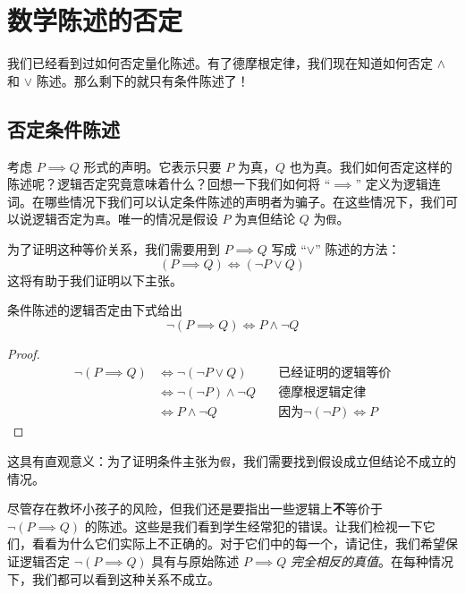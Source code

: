 \section{数学陈述的否定}\label{sec:section4.7}

我们已经看到过如何否定量化陈述。有了德摩根定律，我们现在知道如何否定 $\land$ 和 $\lor$ 陈述。那么剩下的就只有条件陈述了！

\subsection{否定条件陈述}

考虑 $P \implies Q$ 形式的声明。它表示只要 $P$ 为真，$Q$ 也为真。我们如何否定这样的陈述呢？逻辑否定究竟意味着什么？回想一下我们如何将 ``$\implies$'' 定义为逻辑连词。在哪些情况下我们可以认定条件陈述的声明者为骗子。在这些情况下，我们可以说逻辑否定为\verb|真|。唯一的情况是假设 $P$ 为\verb|真|但结论 $Q$ 为\verb|假|。

为了证明这种等价关系，我们需要用到 $P \implies Q$ 写成 ``$\lor$'' 陈述的方法：
\[(P \implies Q) \iff (\neg P \lor Q)\]
这将有助于我们证明以下主张。

\begin{lemma}
    条件陈述的逻辑否定由下式给出
    \[\neg (P \implies Q) \iff P \land \neg Q\]
\end{lemma}

\begin{proof}
    \begin{align*}
        \neg (P \implies Q) &\iff \neg (\neg P \lor Q) &\quad \text{已经证明的逻辑等价} \\
        &\iff \neg (\neg P) \land \neg Q &\quad \text{德摩根逻辑定律} \\
        &\iff P \land \neg Q &\quad \text{因为} \neg (\neg P) \iff P
    \end{align*}
\end{proof}

这具有直观意义：为了证明条件主张为\verb|假|，我们需要找到假设成立但结论不成立的情况。

尽管存在教坏小孩子的风险，但我们还是要指出一些逻辑上\textbf{不}等价于 $\neg (P \implies Q)$ 的陈述。这些是我们看到学生经常犯的错误。让我们检视一下它们，看看为什么它们实际上不正确的。对于它们中的每一个，请记住，我们希望保证逻辑否定 $\neg (P \implies Q)$ 具有与原始陈述 $P \implies Q$ \emph{完全相反的真值}。在每种情况下，我们都可以看到这种关系不成立。

